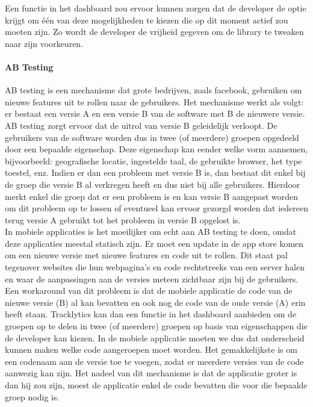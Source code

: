 Een functie in het dashboard zou ervoor kunnen zorgen dat de developer de optie krijgt om \'e\'en van deze mogelijkheden te kiezen die op dit moment actief zou moeten zijn. Zo wordt de developer de vrijheid gegeven om de library te tweaken naar zijn voorkeuren.

\paragraph{AB Testing}
AB testing is een mechanisme dat grote bedrijven, zoals facebook, gebruiken om nieuwe features uit te rollen naar de gebruikers. Het mechanisme werkt als volgt: er bestaat een versie A en een versie B van de software met B de nieuwere versie. AB testing zorgt ervoor dat de uitrol van versie B geleidelijk verloopt. De gebruikers van de software worden dus in twee (of meerdere) groepen opgedeeld door een bepaalde eigenschap. Deze eigenschap kan eender welke vorm aannemen, bijvoorbeeld: geografische locatie, ingestelde taal, de gebruikte browser, het type toestel, enz. Indien er dan een probleem met versie B is, dan bestaat dit enkel bij de groep die versie B al verkregen heeft en dus niet bij alle gebruikers. Hierdoor merkt enkel die groep dat er een probleem is en kan versie B aangepast worden om dit probleem op te lossen of eventueel kan ervoor gezorgd worden dat iedereen terug versie A gebruikt tot het probleem in versie B opgelost is. \\

In mobiele applicaties is het moeilijker om echt aan AB testing te doen, omdat deze applicaties meestal statisch zijn. Er moet een update in de app store komen om een nieuwe versie met nieuwe features en code uit te rollen. Dit staat pal tegenover websites die hun webpagina's en code rechtstreeks van een server halen en waar de aanpassingen aan de versies meteen zichtbaar zijn bij de gebruikers. 
Een workaround van dit probleem is dat de mobiele applicatie de code van de nieuwe versie (B) al kan bevatten en ook nog de code van de oude versie (A) erin heeft staan. Tracklytics kan dan een functie in het dashboard aanbieden om de groepen op te delen in twee (of meerdere) groepen op basis van eigenschappen die de developer kan kiezen. In de mobiele applicatie moeten we dus dat onderscheid kunnen maken welke code aangeroepen moet worden. Het gemakkelijkste is om een codenaam aan de versie toe te voegen, zodat er meerdere versies van de code aanwezig kan zijn. 
Het nadeel van dit mechanisme is dat de applicatie groter is dan hij zou zijn, moest de applicatie enkel de code bevatten die voor die bepaalde groep nodig is.



